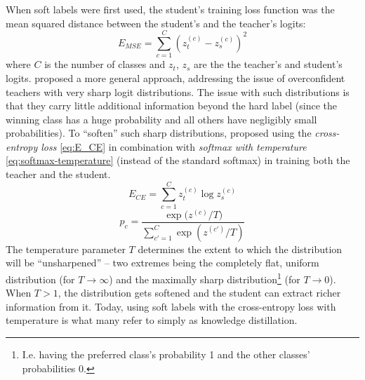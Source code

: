 \documentclass[bsc,frontabs,singlespacing,parskip,deptreport]{infthesis}
\begin{document}
{{{      When soft labels were first used, the student's training loss function was the mean squared distance between the student's and the teacher's logits:
      \begin{equation}
        E_{MSE}=\sum_{c=1}^{C}{(z_t^{(c)}-z_s^{(c)})^2}
        \label{eq:E_MSE}        
      \end{equation}
      where $C$ is the number of classes and $z_t$, $z_s$ are the the teacher's and student's logits.
      \citet{Hinton_2015} proposed a more general approach, addressing the issue of overconfident teachers with very sharp logit distributions. The issue with such distributions is that they carry little additional information beyond the hard label (since the winning class has a huge probability and all others have negligibly small probabilities).
      To ``soften'' such sharp distributions, \citeauthor{Hinton_2015} proposed using the \textit{cross-entropy loss} \autoref{eq:E_CE} in combination with \textit{softmax with temperature} \autoref{eq:softmax-temperature} (instead of the standard softmax) in training both the teacher and the student.
      \begin{equation}
        E_{CE}=\sum_{c=1}^{C}{z_t^{(c)} \log{z_s^{(c)}}}
        \label{eq:E_CE}        
      \end{equation}
      \begin{equation}
        p_c=\frac{\exp{(z^{(c)}/T})}{\sum_{c'=1}^{C}{\exp{(z^{(c')}/T)}}}
        \label{eq:softmax-temperature}        
      \end{equation}
      The temperature parameter $T$ determines the extent to which the distribution will be ``unsharpened'' -- two extremes being the completely flat, uniform distribution (for $T \rightarrow \infty$) and the maximally sharp distribution\footnote{I.e. having the preferred class's probability 1 and the other classes' probabilities 0.} (for $T \rightarrow 0$). When $T > 1$, the distribution gets softened and the student can extract richer information from it. Today, using soft labels with the cross-entropy loss with temperature is what many refer to simply as knowledge distillation.

}}}
\end{document}
